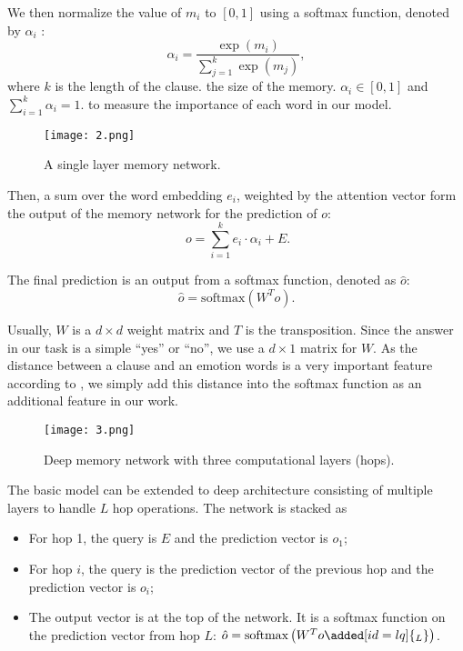 \documentclass[11pt,letterpaper]{article}
\begin{document}
\begin{CJK*}{UTF8}{gbsn}
We then normalize the value of $m_i$ to $\left[ 0,1 \right]$ using a softmax function, denoted by $\alpha_i$ :
\begin{equation}
\alpha_i = \frac { \exp { \left(m_i\right) }} {\sum_{j=1}^k \exp \left({m_j} \right)},
\end{equation}
where $k$ is the length of the clause. 
 the size of the memory.
 $\alpha_i \in \left[ 0,1 \right]$ and $\sum_{i=1}^k {\alpha_i} = 1$. 
to measure the importance of each word in our model.

\begin{figure}[htbp]
\label{fig:figure2}
\texttt{[image: 2.png]}
\caption{A single layer memory network.}
\end{figure}

Then, a sum over the word embedding $e_i$, weighted by the attention vector form the output of the memory network for the prediction of $o$:
\begin{equation}
\ o = \sum_{i=1}^k e_i \cdot \alpha_i + E.
\end{equation}

The final prediction is an output from a softmax function, denoted as $\hat{o}$:
\begin{equation}
\hat{o} = \mbox{softmax} \left( W^T o \right).
\end{equation}

Usually, $W$ is a $d \times d$ weight matrix and $T$ is the transposition. Since the answer in our task is a simple ``yes'' or ``no'', we use a $d \times 1$ matrix for $W$. As the distance between a clause and an emotion words is a very important feature according to \cite{gui2016event}, we simply add this distance into the softmax function as an additional feature in our work. 

\begin{figure}[htbp]
\label{fig:figure3}
\centering
\texttt{[image: 3.png]}
\caption{Deep memory network with three computational layers (hops).}
\end{figure}

The basic model can be extended to deep architecture consisting of multiple layers to handle $L$ hop operations. The network is stacked as 


\begin{itemize}
\item For hop 1, the query is $E$ and the prediction vector is $o_1$;
\item For hop $i$, the query is the prediction vector of the previous hop and the prediction vector is $o_i$;
\item The output vector is at the top of the network. It is a softmax function on the prediction vector from hop $L$: 
$\hat{o} = \mbox{softmax} \left( W^T o\added[id=lq]{_L} \right)$.
\end{itemize}



\end{CJK*}
\end{document}
